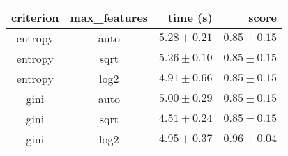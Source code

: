 \begin{tabular}{ccrr}
\toprule
\textbf{criterion} & \textbf{max\_features} & \textbf{time (s)} & \textbf{score}\\
\midrule
entropy & auto & $5.28 \pm 0.21$ & $0.85 \pm 0.15$\\
entropy & sqrt & $5.26 \pm 0.10$ & $0.85 \pm 0.15$\\
entropy & log2 & $4.91 \pm 0.66$ & $0.85 \pm 0.15$\\
gini & auto & $5.00 \pm 0.29$ & $0.85 \pm 0.15$\\
gini & sqrt & $4.51 \pm 0.24$ & $0.85 \pm 0.15$\\
gini & log2 & $4.95 \pm 0.37$ & $0.96 \pm 0.04$\\
\bottomrule
\end{tabular}
